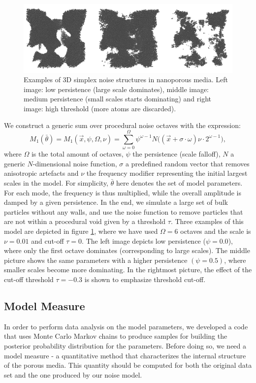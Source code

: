 \documentclass[aps,pre,twocolumn,letterpaper,floatfix,showpacs]{revtex4}
\begin{document}
\begin{figure}
\includegraphics[width=.95\textwidth]{model_examples.png}
\caption{Examples of 3D simplex noise structures in nanoporous media. Left image: low persistence (large scale dominates), middle image: medium persistence (small scales starts dominating) and right image: high threshold (more atoms are discarded). }
\label{fig:model_example}
\end{figure}
We construct a generic sum over procedural noise octaves with the expression: 
\begin{equation}
  M_1(\bar \theta) = M_1(\vec x, \psi, \Omega, \nu) = \sum_{\omega=0}^{\Omega} \psi^{\omega -1}   N\big((\vec x + \sigma \cdot \omega)\nu \cdot 2^{\omega-1} \big),
\label{eq:noisemodel1}
\end{equation}
where $\Omega$ is the total amount of octaves, $\psi$ the persistence (scale falloff), $N$ a generic $N$-dimensional noise function, $\sigma$ a predefined random vector that removes anisotropic artefacts and $\nu$ the frequency modifier representing the initial largest scales in the model. For simplicity, $\bar \theta$ here denotes the set of model parameters. For each mode, the frequency is thus multiplied, while the overall amplitude is damped by a given persistence. In the end, we simulate a large set of bulk particles without any walls, and use the noise function to remove particles that are not within a procedural void given by a threshold $\tau$. Three examples of this model are depicted in figure \ref{fig:model_example}, where we have used $\Omega=6$ octaves and the scale is $\nu=0.01$ and cut-off $\tau=0$. The left image depicts low persistence ($\psi = 0.0$), where only the first octave dominates (corresponding to large scales). The middle picture shows the same parameters with a higher persistence $(\psi = 0.5)$, where smaller scales become more dominating. In the rightmost picture, the effect of the cut-off threshold $\tau = -0.3$ is shown to emphasize threshold cut-off. 


\subsection{Model Measure}
In order to perform data analysis on the model parameters, we developed a code that uses Monte Carlo Markov chains to produce samples for building the posterior probability distribution for the parameters. 
Before doing so, we need a model measure - a quantitative method that characterizes the internal structure of the porous media. This quantity should be computed for both the original data set and the one produced by our noise model. 
\end{document}

